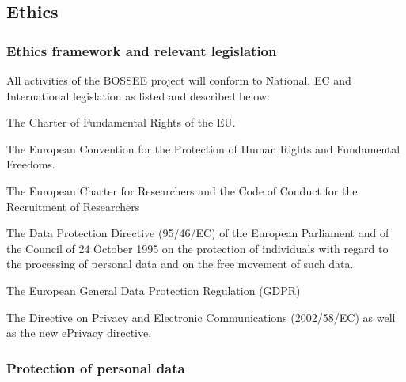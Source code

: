 \subsection{Ethics}

\subsubsection{Ethics framework and relevant legislation}

All activities of the BOSSEE project will conform to National, EC and International legislation as listed and described below:
\begin{compactitem}
\item The Charter of Fundamental Rights of the EU.
\item The European Convention for the Protection of Human Rights and Fundamental Freedoms.
\item The European Charter for Researchers and the Code of Conduct for the Recruitment of Researchers
\item The Data Protection Directive (95/46/EC) of the European Parliament and of the Council of 24 October 1995 on the protection of individuals with regard to the processing of personal data and on the free movement of such data.
\item The European General Data Protection Regulation (GDPR)
\item The Directive on Privacy and Electronic Communications (2002/58/EC) as well as the new ePrivacy directive.
\end{compactitem}

\subsubsection{Protection of personal data}

